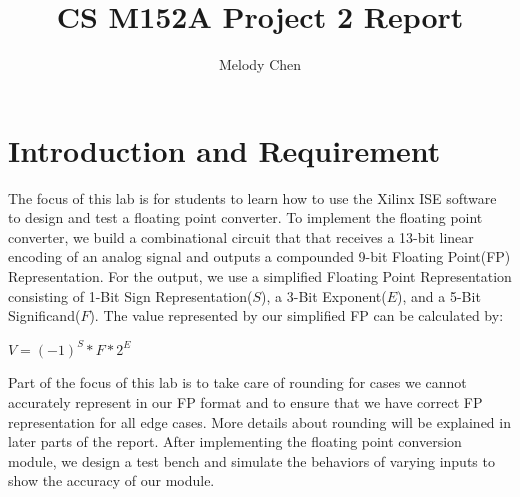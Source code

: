 \documentclass{article}
\title{\vspace{-2.0cm}CS M152A Project 2 Report}
\author{Melody Chen}
\begin{document}
\maketitle
\section{Introduction and Requirement} 
The focus of this lab is for students to learn how to use the Xilinx ISE software to design and test a floating point converter. To implement the floating point converter, we build a combinational circuit that that receives a 13-bit linear encoding of an analog signal and outputs a compounded 9-bit Floating Point(FP) Representation. For the output, we use a simplified Floating Point Representation consisting of 1-Bit Sign Representation($S$), a 3-Bit Exponent($E$), and a 5-Bit Significand($F$). The value represented by our simplified FP can be calculated by:
\begin{center}
    $V = (-1)^{S} * F * 2^{E}$
\end{center}
Part of the focus of this lab is to take care of rounding for cases we cannot accurately represent in our FP format and to ensure that we have correct FP representation for all edge cases. More details about rounding will be explained in later parts of the report. After implementing the floating point conversion module, we design a test bench and simulate the behaviors of varying inputs to show the accuracy of our module. 
\end{document}
